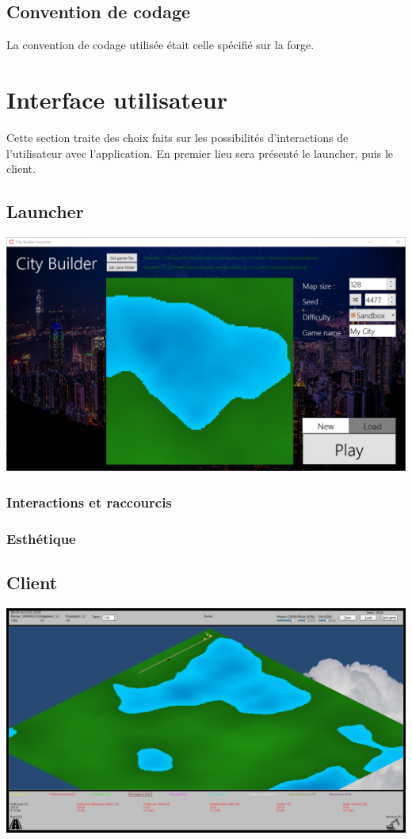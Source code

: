 \documentclass[a4paper,10pt,openany,oneside]{report}
\begin{document}
\subsection{Convention de codage}
La convention de codage utilisée était celle spécifié sur la forge.
\section{Interface utilisateur}
Cette section traite des choix faits sur les possibilités d'interactions de l'utilisateur avec l'application. En premier lieu sera présenté le launcher, puis le client. 
\subsection{Launcher}
\includegraphics[width=\textwidth]{img/ui_launcher.png}
\subsubsection{Interactions et raccourcis}
\subsubsection{Esthétique}
\subsection{Client}
\includegraphics[width=\textwidth]{img/ui_client.png}
\end{document}
